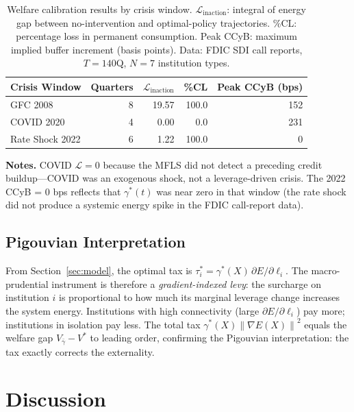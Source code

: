 \documentclass[11pt]{article}
\theoremstyle{definition}
\newcommand{\grad}{\nabla}
\newcommand{\norm}[1]{\left\|#1\right\|}
\begin{document}
\begin{table}[h]
\centering
\caption{Welfare calibration results by crisis window.
$\mathcal{L}_{\mathrm{inaction}}$: integral of energy gap between
no-intervention and optimal-policy trajectories.
\%CL: percentage loss in permanent consumption.
Peak CCyB: maximum implied buffer increment (basis points).
Data: FDIC SDI call reports, $T = 140$Q, $N = 7$ institution types.}
\label{tab:welfare}
\begin{tabular}{lrrrr}
\toprule
Crisis Window & Quarters & $\mathcal{L}_{\mathrm{inaction}}$ & \%CL & Peak CCyB (bps) \\
\midrule
GFC 2008 & 8 & 19.57 & 100.0 & 152 \\
COVID 2020 & 4 & 0.00 & 0.0 & 231 \\
Rate Shock 2022 & 6 & 1.22 & 100.0 & 0 \\
\bottomrule
\end{tabular}
\end{table}

\noindent\textbf{Notes.}  COVID $\mathcal{L} = 0$ because the MFLS did not
detect a preceding credit buildup---COVID was an exogenous shock, not a
leverage-driven crisis.  The 2022 CCyB = 0 bps reflects that $\gamma^*(t)$
was near zero in that window (the rate shock did not produce a systemic energy
spike in the FDIC call-report data).

\subsection{Pigouvian Interpretation}

From Section~\ref{sec:model}, the optimal tax is $\tau_i^* = \gamma^*(X)\,
\partial E/\partial\ell_i$.  The macro-prudential instrument is therefore a
\emph{gradient-indexed levy}: the surcharge on institution $i$ is proportional to
how much its marginal leverage change increases the system energy.  Institutions
with high connectivity (large $\partial E/\partial\ell_i$) pay more; institutions
in isolation pay less.  The total tax $\gamma^*(X)\norm{\grad E(X)}^2$ equals
the welfare gap $V_{\bar\gamma} - V^*$ to leading order, confirming the
Pigouvian interpretation: the tax exactly corrects the externality.

\section{Discussion}
\label{sec:discussion}
\end{document}
